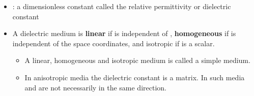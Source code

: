 \begin{ELunit}


\begin{itemize}
\item
  : a dimensionless constant called the relative permittivity or dielectric constant
\item
  A dielectric medium is \textbf{linear} if  is independent of , \textbf{homogeneous} if  is independent of the space coordinates, and isotropic if  is a scalar.

  \begin{itemize}
  \tightlist
  \item
    A linear, homogeneous and isotropic medium is called a simple medium.
  \item
    In anisotropic media the dielectric constant is a matrix. In such media  and  are not necessarily in the same direction.
  \end{itemize}
\end{itemize}

\end{ELunit}


